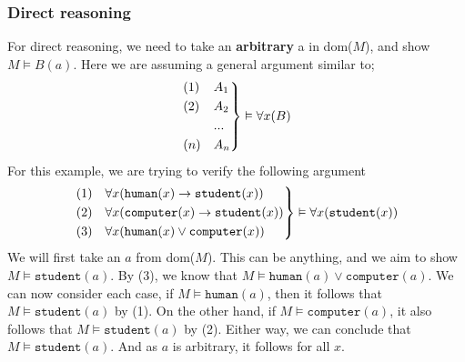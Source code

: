 \documentclass[a4paper, 12pt]{article}
\begin{document}
            \subsubsection*{Direct reasoning}
                For direct reasoning, we need to take an \textbf{arbitrary} a in dom($M$), and show $M \vDash B(a)$. Here we are assuming a general argument similar to;
                \begin{equation*}
                    \begin{rcases}
                        (1) & A_1 \\
                        (2) & A_2 \\
                        & ... \\
                        (n) & A_n
                    \end{rcases}
                    \vDash \forall x (B)
                \end{equation*}
                For this example, we are trying to verify the following argument
                \begin{equation*}
                    \begin{rcases}
                        (1) & \forall x (\texttt{human}(x) \rightarrow \texttt{student}(x)) \\
                        (2) & \forall x (\texttt{computer}(x) \rightarrow \texttt{student}(x)) \\
                        (3) & \forall x (\texttt{human}(x) \lor \texttt{computer}(x))
                    \end{rcases}
                    \vDash \forall x (\texttt{student}(x))
                \end{equation*}
                We will first take an $a$ from dom($M$). This can be anything, and we aim to show $M \vDash \texttt{student}(a)$. By (3), we know that $M \vDash \texttt{human}(a) \lor \texttt{computer}(a)$. We can now consider each case, if $M \vDash \texttt{human}(a)$, then it follows that $M \vDash \texttt{student}(a)$ by (1). On the other hand, if $M \vDash \texttt{computer}(a)$, it also follows that $M \vDash \texttt{student}(a)$ by (2). Either way, we can conclude that $M \vDash \texttt{student}(a)$. And as $a$ is arbitrary, it follows for all $x$.
                \medskip
\end{document}
